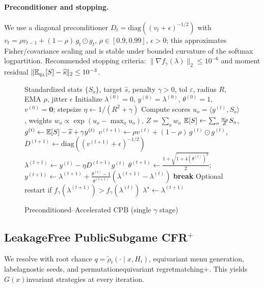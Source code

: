 \paragraph{Preconditioner and stopping.}
We use a diagonal preconditioner $D_t=\mathrm{diag}((v_t+\epsilon)^{-1/2})$ with $v_t=\rho v_{t-1}+(1-\rho)\,g_t\odot g_t$, $\rho\in[0.9,0.99]$, $\epsilon>0$; this approximates Fisher/covariance scaling and is stable under bounded curvature of the softmax log\textendash partition. Recommended stopping criteria: $\|\nabla f_\gamma(\lambda)\|_2\le 10^{-6}$ and moment residual $\|\mathbb{E}_{q_\lambda}[S]-\widehat s\|_2\le 10^{-3}$.

\begin{figure}[t]
\centering
\begin{adjustbox}{width=\linewidth}
\begin{minipage}{\linewidth}
\begin{algorithm}[H]
\caption{Preconditioned--Accelerated CPB (single $\gamma$ stage)}
\label{alg:cpb}
\begin{algorithmic}[1]
\Require Standardized stats $\{S_o\}$, target $\widehat s$, penalty $\gamma>0$, tol $\varepsilon$, radius $R$, EMA $\rho$, jitter $\epsilon$
\State Initialize $\lambda^{(0)}=0$, $y^{(0)}=\lambda^{(0)}$, $\theta^{(0)}=1$, $v^{(0)}=\mathbf{0}$; stepsize $\eta\gets 1/(R^2+\gamma)$
  \State Compute scores $u_o=\langle y^{(t)},S_o\rangle$, weights $w_o \propto \exp(u_o - \max_o u_o)$, $Z=\sum_o w_o$
  \State $\mathbb{E}[S]\gets \sum_o \frac{w_o}{Z} S_o$, $g^{(t)} \gets \mathbb{E}[S]-\widehat s + \gamma y^{(t)}$
  \State $v^{(t+1)}\gets \rho v^{(t)} + (1-\rho)\,g^{(t)}\odot g^{(t)}$, $D^{(t+1)}\gets \mathrm{diag}((v^{(t+1)}+\epsilon)^{-1/2})$
  \State $\lambda^{(t+1)} \gets y^{(t)} - \eta D^{(t+1)} g^{(t)}$
  \State $\theta^{(t+1)} \gets \tfrac{1+\sqrt{1+4(\theta^{(t)})^2}}{2}$; $y^{(t+1)} \gets \lambda^{(t+1)} + \tfrac{\theta^{(t)}-1}{\theta^{(t+1)}}(\lambda^{(t+1)}-\lambda^{(t)})$
   \textbf{break} \EndIf
  \State Optional restart if $f_\gamma(\lambda^{(t+1)})>f_\gamma(\lambda^{(t)})$
\EndFor
\State \Return $\lambda^{\star}\gets \lambda^{(t+1)}$
\end{algorithmic}
\end{algorithm}
\end{minipage}
\end{adjustbox}
\end{figure}

\subsection{Leakage\textendash Free Public\textendash Subgame CFR$^+$}
We re\textendash solve with root chance $q=\tilde\rho_t(\cdot\mid x,H_i)$, equivariant menu generation, label\textendash agnostic seeds, and permutation\textendash equivariant regret\textendash matching$+$. This yields $G(x)$\textendash invariant strategies at every iteration.

